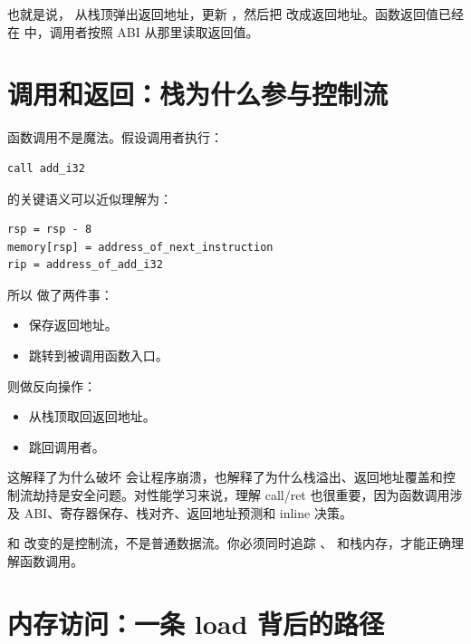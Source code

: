 也就是说， 从栈顶弹出返回地址，更新 ，然后把  改成返回地址。函数返回值已经在  中，调用者按照 ABI 从那里读取返回值。

\section{调用和返回：栈为什么参与控制流}

函数调用不是魔法。假设调用者执行：

\begin{lstlisting}
call add_i32
\end{lstlisting}

 的关键语义可以近似理解为：

\begin{center}
\begin{minipage}{0.72\linewidth}
\begin{verbatim}
rsp = rsp - 8
memory[rsp] = address_of_next_instruction
rip = address_of_add_i32
\end{verbatim}
\end{minipage}
\end{center}

所以  做了两件事：

\begin{itemize}
  \item 保存返回地址。
  \item 跳转到被调用函数入口。
\end{itemize}

 则做反向操作：

\begin{itemize}
  \item 从栈顶取回返回地址。
  \item 跳回调用者。
\end{itemize}

这解释了为什么破坏  会让程序崩溃，也解释了为什么栈溢出、返回地址覆盖和控制流劫持是安全问题。对性能学习来说，理解 call/ret 也很重要，因为函数调用涉及 ABI、寄存器保存、栈对齐、返回地址预测和 inline 决策。

\begin{warningbox}
 和  改变的是控制流，不是普通数据流。你必须同时追踪 、 和栈内存，才能正确理解函数调用。
\end{warningbox}

\section{内存访问：一条 load 背后的路径}


